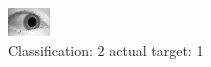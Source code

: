 \begin{figure}[h!]
\begin{center}
\includegraphics[width=0.60\columnwidth]{figures/ID1538_class_2_target_1.png}
\end{center}
\caption{ Classification: 2 actual target: 1}
\label{fig:ID1538_class_2_target_1}
\end{figure}
